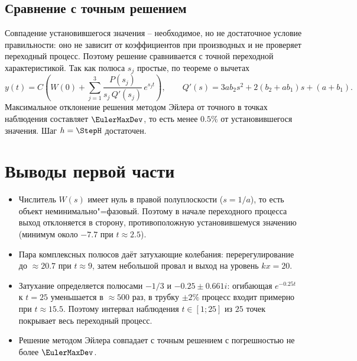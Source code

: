         \subsection*{Сравнение с точным решением}
            Совпадение установившегося значения -- необходимое, но не достаточное условие правильности: оно не зависит от коэффициентов при производных и не проверяет переходный процесс. Поэтому решение сравнивается с точной переходной характеристикой. Так как полюса $s_j$ простые, по теореме о вычетах
            $$
                y(t) = C\left(W(0) + \sum_{j=1}^{3} \frac{P(s_j)}{s_j\,Q'(s_j)}\,e^{s_jt}\right),
                \qquad Q'(s) = 3ab_2s^2 + 2(b_2+ab_1)s + (a+b_1).
            $$
            Максимальное отклонение решения методом Эйлера от точного в точках наблюдения составляет $\EulerMaxDev$, то есть менее $0.5\%$ от установившегося значения. Шаг $h = \StepH$ достаточен.

    \section{Выводы первой части}
        \begin{itemize}
            \item Числитель $W(s)$ имеет нуль в правой полуплоскости ($s = 1/a$), то есть объект неминимально"=фазовый. Поэтому в начале переходного процесса выход отклоняется в сторону, противоположную установившемуся значению (минимум около $-7.7$ при $t \approx 2.5$).
            \item Пара комплексных полюсов даёт затухающие колебания: перерегулирование до $\approx 20.7$ при $t \approx 9$, затем небольшой провал и выход на уровень $kx = 20$.
            \item Затухание определяется полюсами $-1/3$ и $-0.25 \pm 0.661i$: огибающая $e^{-0.25t}$ к $t = 25$ уменьшается в $\approx 500$ раз, в трубку $\pm2\%$ процесс входит примерно при $t \approx 15.5$. Поэтому интервал наблюдения $t \in [1; 25]$ из $25$ точек покрывает весь переходный процесс.
            \item Решение методом Эйлера совпадает с точным решением с погрешностью не более $\EulerMaxDev$.
        \end{itemize}
